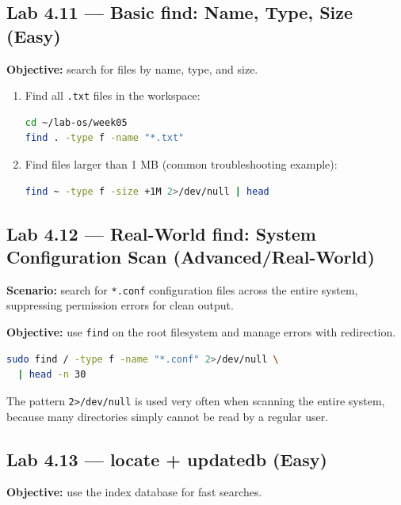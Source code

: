 \subsection*{Lab 4.11 --- Basic find: Name, Type, Size (Easy)}
\textbf{Objective:} search for files by name, type, and size.

\begin{enumerate}
    \item Find all \texttt{.txt} files in the workspace:
\begin{lstlisting}[language=bash, caption={find by name and type}]
cd ~/lab-os/week05
find . -type f -name "*.txt"
\end{lstlisting}

    \item Find files larger than 1 MB (common troubleshooting example):
\begin{lstlisting}[language=bash, caption={find by file size}]
find ~ -type f -size +1M 2>/dev/null | head
\end{lstlisting}
\end{enumerate}

\subsection*{Lab 4.12 --- Real-World find: System Configuration Scan (Advanced/Real-World)}
\textbf{Scenario:} search for \texttt{*.conf} configuration files across the
entire system, suppressing permission errors for clean output.

\textbf{Objective:} use \texttt{find} on the root filesystem and manage errors
with redirection.

\begin{lstlisting}[language=bash, caption={Scanning *.conf without flooding permission errors}]
sudo find / -type f -name "*.conf" 2>/dev/null \
  | head -n 30
\end{lstlisting}

\begin{tipbox}
The pattern \texttt{2>/dev/null} is used very often when scanning the entire
system, because many directories simply cannot be read by a regular user.
\end{tipbox}

\subsection*{Lab 4.13 --- locate + updatedb (Easy)}
\textbf{Objective:} use the index database for fast searches.

